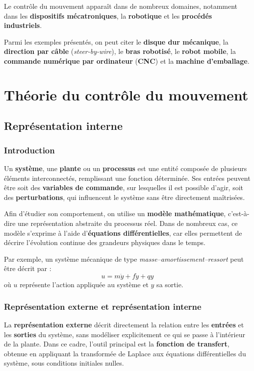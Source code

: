 \documentclass[11pt,a4paper]{article}
\begin{document}
Le contrôle du mouvement apparaît dans de nombreux domaines, notamment dans les \textbf{dispositifs mécatroniques}, la \textbf{robotique} et les \textbf{procédés industriels}.

Parmi les exemples présentés, on peut citer le \textbf{disque dur mécanique}, la \textbf{direction par câble} (\textit{steer-by-wire}), le \textbf{bras robotisé}, le \textbf{robot mobile}, la \textbf{commande numérique par ordinateur} (\textbf{CNC}) et la \textbf{machine d'emballage}.

\newpage
\section{Théorie du contrôle du mouvement}


\subsection{Représentation interne}

\subsubsection{Introduction}

Un \textbf{système}, une \textbf{plante} ou un \textbf{processus} est une entité composée de plusieurs éléments interconnectés, remplissant une fonction déterminée. Ses entrées peuvent être soit des \textbf{variables de commande}, sur lesquelles il est possible d'agir, soit des \textbf{perturbations}, qui influencent le système sans être directement maîtrisées.

Afin d'étudier son comportement, on utilise un \textbf{modèle mathématique}, c'est-à-dire une représentation abstraite du processus réel. Dans de nombreux cas, ce modèle s'exprime à l'aide d'\textbf{équations différentielles}, car elles permettent de décrire l'évolution continue des grandeurs physiques dans le temps.

Par exemple, un système mécanique de type \textit{masse--amortissement--ressort} peut être décrit par :
\[
u = m\ddot{y} + f\dot{y} + qy
\]
où \(u\) représente l'action appliquée au système et \(y\) sa sortie.

\subsubsection{Représentation externe et représentation interne}

La \textbf{représentation externe} décrit directement la relation entre les \textbf{entrées} et les \textbf{sorties} du système, sans modéliser explicitement ce qui se passe à l'intérieur de la plante. Dans ce cadre, l'outil principal est la \textbf{fonction de transfert}, obtenue en appliquant la transformée de Laplace aux équations différentielles du système, sous conditions initiales nulles.
\end{document}
